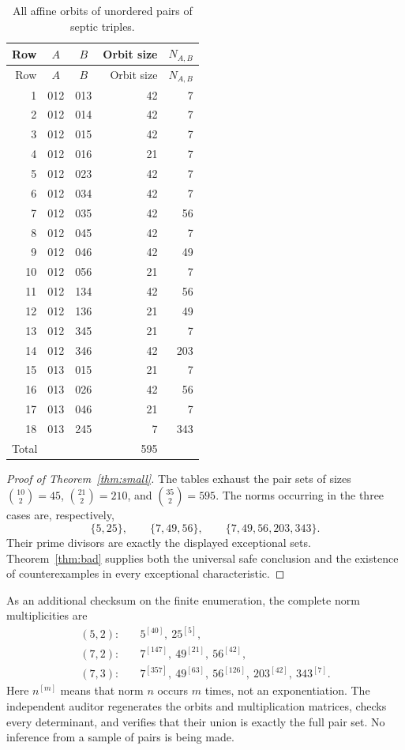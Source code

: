 \documentclass[11pt,a4paper]{article}
\theoremstyle{definition}
\theoremstyle{remark}
\begin{document}
\begin{center}
\begin{longtable}{@{}rccrr@{}}
\caption{All affine orbits of unordered pairs of septic triples.}\label{tab:triples}\\
\toprule
Row&$A$&$B$&Orbit size&$N_{A,B}$\\
\midrule\endfirsthead
\toprule Row&$A$&$B$&Orbit size&$N_{A,B}$\\\midrule\endhead
1&012&013&42&7\\
2&012&014&42&7\\
3&012&015&42&7\\
4&012&016&21&7\\
5&012&023&42&7\\
6&012&034&42&7\\
7&012&035&42&56\\
8&012&045&42&7\\
9&012&046&42&49\\
10&012&056&21&7\\
11&012&134&42&56\\
12&012&136&21&49\\
13&012&345&21&7\\
14&012&346&42&203\\
15&013&015&21&7\\
16&013&026&42&56\\
17&013&046&21&7\\
18&013&245&7&343\\
\midrule
\multicolumn{3}{l}{Total}&595&\\
\bottomrule
\end{longtable}
\end{center}

\begin{proof}[Proof of Theorem~\ref{thm:small}]
The tables exhaust the pair sets of sizes
$\binom{10}{2}=45$, $\binom{21}{2}=210$, and $\binom{35}{2}=595$.
The norms occurring in the three cases are, respectively,
\[
 \{5,25\},\qquad \{7,49,56\},\qquad
 \{7,49,56,203,343\}.
\]
Their prime divisors are exactly the displayed exceptional sets.
Theorem~\ref{thm:bad} supplies both the universal safe conclusion and the
existence of counterexamples in every exceptional characteristic.
\end{proof}

As an additional checksum on the finite enumeration, the complete norm
multiplicities are
\begin{align*}
 (5,2):&\quad 5^{[40]},\ 25^{[5]},\\
 (7,2):&\quad 7^{[147]},\ 49^{[21]},\ 56^{[42]},\\
 (7,3):&\quad 7^{[357]},\ 49^{[63]},\ 56^{[126]},\ 203^{[42]},\ 343^{[7]}.
\end{align*}
Here $n^{[m]}$ means that norm $n$ occurs $m$ times, not an exponentiation.
The independent auditor regenerates the orbits and multiplication matrices,
checks every determinant, and verifies that their union is exactly the full
pair set. No inference from a sample of pairs is being made.
\end{document}
